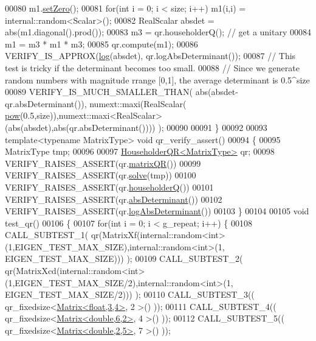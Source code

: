 \begin{DoxyCode}
00080   m1.\hyperlink{class_eigen_1_1_plain_object_base_ac21ad5f989f320e46958b75ac8d9a1da}{setZero}();
00081   \textcolor{keywordflow}{for}(\textcolor{keywordtype}{int} i = 0; i < size; i++) m1(i,i) = internal::random<Scalar>();
00082   RealScalar absdet = abs(m1.diagonal().prod());
00083   m3 = qr.householderQ(); \textcolor{comment}{// get a unitary}
00084   m1 = m3 * m1 * m3;
00085   qr.compute(m1);
00086   VERIFY\_IS\_APPROX(\hyperlink{structlog}{log}(absdet), qr.logAbsDeterminant());
00087   \textcolor{comment}{// This test is tricky if the determinant becomes too small.}
00088   \textcolor{comment}{// Since we generate random numbers with magnitude rrange [0,1], the average determinant is 0.5^size}
00089   VERIFY\_IS\_MUCH\_SMALLER\_THAN( abs(absdet-qr.absDeterminant()), numext::maxi(RealScalar(
      \hyperlink{group___core___module_ab6dc101d82e8228a19a8840e3a29c1c9}{pow}(0.5,size)),numext::maxi<RealScalar>(abs(absdet),abs(qr.absDeterminant()))) );
00090   
00091 \}
00092 
00093 \textcolor{keyword}{template}<\textcolor{keyword}{typename} MatrixType> \textcolor{keywordtype}{void} qr\_verify\_assert()
00094 \{
00095   MatrixType tmp;
00096 
00097   \hyperlink{group___q_r___module}{HouseholderQR<MatrixType>} qr;
00098   VERIFY\_RAISES\_ASSERT(qr.\hyperlink{group___q_r___module_ae837f2fb30099212c53b3042c7d699c9}{matrixQR}())
00099   VERIFY\_RAISES\_ASSERT(qr.\hyperlink{group___q_r___module_a3e8e56769bbaaed0616ad98c4ff99c7b}{solve}(tmp))
00100   VERIFY\_RAISES\_ASSERT(qr.\hyperlink{group___q_r___module_affd506c10ef2d25f56e7b1f9f25ff885}{householderQ}())
00101   VERIFY\_RAISES\_ASSERT(qr.\hyperlink{group___q_r___module_aaf4ef26c0b7affc91431ec59c92d64c3}{absDeterminant}())
00102   VERIFY\_RAISES\_ASSERT(qr.\hyperlink{group___q_r___module_af61b6dbef34fc51c825182b16dc43ca1}{logAbsDeterminant}())
00103 \}
00104 
00105 \textcolor{keywordtype}{void} test\_qr()
00106 \{
00107   \textcolor{keywordflow}{for}(\textcolor{keywordtype}{int} i = 0; i < g\_repeat; i++) \{
00108    CALL\_SUBTEST\_1( qr(MatrixXf(internal::random<int>(1,EIGEN\_TEST\_MAX\_SIZE),internal::random<int>(1,
      EIGEN\_TEST\_MAX\_SIZE))) );
00109    CALL\_SUBTEST\_2( qr(MatrixXcd(internal::random<int>(1,EIGEN\_TEST\_MAX\_SIZE/2),internal::random<int>(1,
      EIGEN\_TEST\_MAX\_SIZE/2))) );
00110    CALL\_SUBTEST\_3(( qr\_fixedsize<\hyperlink{group___core___module_class_eigen_1_1_matrix}{Matrix<float,3,4>}, 2 >() ));
00111    CALL\_SUBTEST\_4(( qr\_fixedsize<\hyperlink{group___core___module_class_eigen_1_1_matrix}{Matrix<double,6,2>}, 4 >() ));
00112    CALL\_SUBTEST\_5(( qr\_fixedsize<\hyperlink{group___core___module_class_eigen_1_1_matrix}{Matrix<double,2,5>}, 7 >() ));

\end{DoxyCode}
